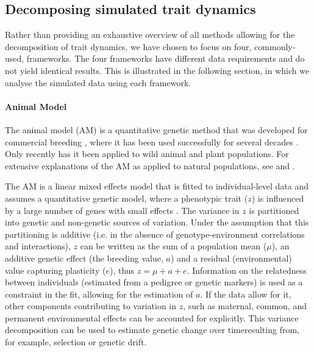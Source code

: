 \subsection{Decomposing simulated trait dynamics}
Rather than providing an exhaustive overview of all methods allowing for the decomposition of trait dynamics, we have chosen to focus on four, commonly-used, frameworks. The four frameworks have different data requirements and do not yield identical results. This is illustrated in the following section, in which we analyse the simulated data using each framework.

\paragraph{Animal Model} 
The animal model (AM) is a quantitative genetic method that was developed for commercial breeding \parencite{Henderson1950,Henderson1976}, where it has been used successfully for several decades \parencite[e.g.][]{Lynch1998}. Only recently has it been applied to wild animal \parencite[e.g.][]{Reale2003,Postma2014} and plant \parencite{Stinchcombe2014} populations. For extensive explanations of the AM as applied to natural populations, see \cite{Kruuk2004} and \cite{Wilson2009}. 

The AM is a linear mixed effects model that is fitted to individual-level data and assumes a quantitative genetic model, where a phenotypic trait ($z$) is influenced by a large number of genes with small effects \parencite{Roff2007}. The variance in $z$ is partitioned into genetic and non-genetic sources of variation. Under the assumption that this partitioning is additive (i.e. in the absence of genotype-environment correlations and interactions), $z$ can be written as the sum of a population mean ($\mu$), an additive genetic effect (the breeding value, $a$) and a residual (environmental) value capturing plasticity ($e$), thus $z=\mu+a+e$. Information on the relatedness between individuals (estimated from a pedigree or genetic markers) is used as a constraint in the fit, allowing for the estimation of $a$. If the data allow for it, other components contributing to variation in $z$, such as maternal, common, and permanent environmental effects can be accounted for explicitly. This variance decomposition can be used to estimate genetic change over time\textemdash resulting from, for example, selection or genetic drift. 

